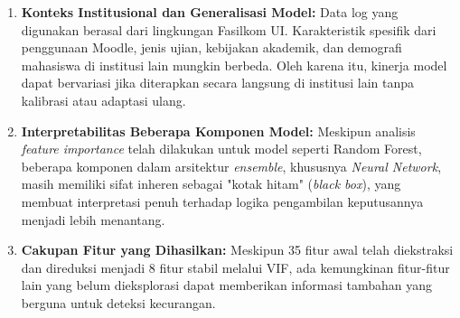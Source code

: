 \begin{enumerate}
\item \textbf{Konteks Institusional dan Generalisasi Model:} Data log yang digunakan berasal dari lingkungan Fasilkom UI. Karakteristik spesifik dari penggunaan Moodle, jenis ujian, kebijakan akademik, dan demografi mahasiswa di institusi lain mungkin berbeda. Oleh karena itu, kinerja model dapat bervariasi jika diterapkan secara langsung di institusi lain tanpa kalibrasi atau adaptasi ulang.
\item \textbf{Interpretabilitas Beberapa Komponen Model:} Meskipun analisis \textit{feature importance} telah dilakukan untuk model seperti Random Forest, beberapa komponen dalam arsitektur \textit{ensemble}, khususnya \textit{Neural Network}, masih memiliki sifat inheren sebagai "kotak hitam" (\textit{black box}), yang membuat interpretasi penuh terhadap logika pengambilan keputusannya menjadi lebih menantang.
\item \textbf{Cakupan Fitur yang Dihasilkan:} Meskipun 35 fitur awal telah diekstraksi dan direduksi menjadi 8 fitur stabil melalui VIF, ada kemungkinan fitur-fitur lain yang belum dieksplorasi dapat memberikan informasi tambahan yang berguna untuk deteksi kecurangan.
\end{enumerate}

